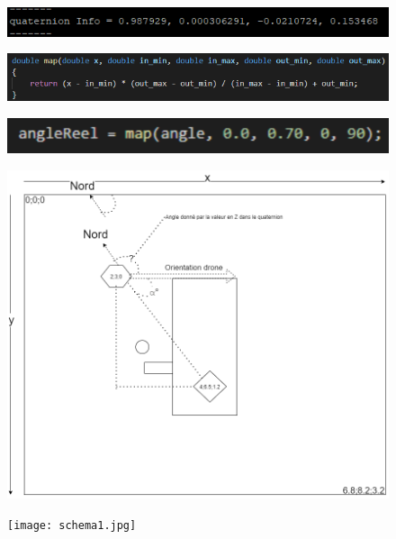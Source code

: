 \documentclass[12pt]{beamer}
\begin{document}
	\begin{frame}[allowframebreaks]
	    \begin{figure}
		    \centering
		    \includegraphics[width=1\linewidth]{quat.png}
	    \end{figure}
	    
	    \begin{figure}
		    \centering
		    \includegraphics[width=1\linewidth]{map.png}
	    \end{figure}
	    
	    \begin{figure}
		    \centering
		    \includegraphics[width=1\linewidth]{mapused.png}
	    \end{figure}
	    
	    \begin{figure}
		    \centering
		    \includegraphics[width=0.8\linewidth]{schema.png}
	    \end{figure}
	    
	    \begin{figure}
		    \centering
		    \texttt{[image: schema1.jpg]}
	    \end{figure}
	\end{frame}
\end{document}
